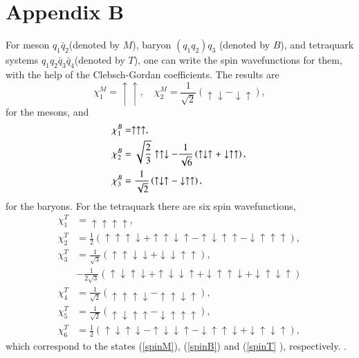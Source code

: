 \documentclass[12pt,prd,onecolumn,floatfix,nofootinbib]{revtex4}
\begin{document}
\section*{Appendix B}

\label{AppendixB} \setcounter{equation}{0} \renewcommand{\theequation}{B%
\arabic{equation}} For meson $q_{1}\bar{q}_{2}$(denoted by $M$), baryon $%
(q_{1}q_{2})q_{3}$ (denoted by $B$), and tetraquark systems $q_{1}q_{2}\bar{q%
}_{3}\bar{q}_{4}$(denoted by $T$), one can write the spin wavefunctions for
them, with the help of the Clebsch-Gordan coefficients. The results are
\begin{equation}
\chi _{1}^{M}=\uparrow \uparrow ,\quad \chi _{2}^{M}=\frac{1}{\sqrt{2}}%
\left( \uparrow \downarrow -\downarrow \uparrow \right) ,  \label{pspinM}
\end{equation}%
for the mesons, and
\begin{equation}
\begin{aligned} \chi_{1}^{B}&=\uparrow\uparrow\uparrow, \\
\chi_{2}^{B}&=\sqrt{\frac{2}{3}}\uparrow\uparrow\downarrow-\frac{1}{%
\sqrt{6}}
\left(\uparrow\downarrow\uparrow+\downarrow\uparrow\uparrow\right), \\
\chi_{3}^{B}&=\frac{1}{\sqrt{2}}
\left(\uparrow\downarrow\uparrow-\downarrow\uparrow\uparrow\right),
\end{aligned}  \label{pspinB}
\end{equation}%
for the baryons. For the tetraquark there are six spin wavefunctions,
\begin{equation}
\begin{aligned} \chi_{1}^{T}&=\uparrow\uparrow\uparrow\uparrow, \\
\chi_{2}^{T}&=\frac{1}{2}
\left(\uparrow\uparrow\uparrow\downarrow+\uparrow\uparrow\downarrow\uparrow-%
\uparrow\downarrow\uparrow\uparrow-\downarrow\uparrow\uparrow\uparrow%
\right), \\ \chi_{3}^{T}&=\frac{1}{\sqrt{3}}
\left(\uparrow\uparrow\downarrow\downarrow+\downarrow\downarrow\uparrow%
\uparrow\right), \\ &-\frac{1}{2\sqrt{3}}
\left(\uparrow\downarrow\uparrow\downarrow+\uparrow\downarrow\downarrow%
\uparrow+\downarrow\uparrow\uparrow\downarrow+\downarrow\uparrow\downarrow%
\uparrow\right) \\ \chi_{4}^{T}&=\frac{1}{\sqrt{2}}
\left(\uparrow\uparrow\uparrow\downarrow-\uparrow\uparrow\downarrow\uparrow%
\right), \\ \chi_{5}^{T}&=\frac{1}{\sqrt{2}}
\left(\uparrow\downarrow\uparrow\uparrow-\downarrow\uparrow\uparrow\uparrow%
\right), \\ \chi_{6}^{T}&=\frac{1}{2}
\left(\uparrow\downarrow\uparrow\downarrow-\uparrow\downarrow\downarrow%
\uparrow-\downarrow\uparrow\uparrow\downarrow+\downarrow\uparrow\downarrow%
\uparrow\right), \end{aligned}  \label{pspinT}
\end{equation}%
which correspond to the states (\ref{spinM}), (\ref{spinB}) and (\ref{spinT}%
), respectively. .
\end{document}
